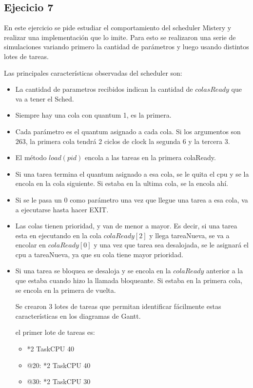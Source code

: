 \newpage
\subsection{Ejecicio 7}

En este ejercicio se pide estudiar el comportamiento del scheduler Mistery y realizar una implementación que lo imite.
Para esto se realizaron una serie de simulaciones variando primero la cantidad de parámetros y luego usando distintos lotes de tareas.

Las principales características observadas del scheduler son:
\begin{itemize}
\item La cantidad de parametros recibidos indican la cantidad de $colasReady$ que va a tener el Sched.
\item Siempre hay una cola con quantum 1, es la primera.
\item Cada parámetro es el quantum asignado a cada cola. Si los argumentos son $2 6 3$, la primera cola tendrá 2 ciclos de clock
la segunda 6 y la tercera 3.
\item El método $load(pid)$ encola a las tareas en la primera colaReady. 
\item Si una tarea termina el quantum asignado a esa cola, se le quita el cpu y se la encola en la cola siguiente. Si estaba en la ultima cola, se la encola ahí.
\item Si se le pasa un 0 como parámetro una vez que llegue una tarea a esa cola, va a ejecutarse hasta hacer EXIT.
\item Las colas tienen prioridad, y van de menor a mayor. Es decir, si una tarea esta en ejecutando en la cola $colaReady[2]$ y llega tareaNueva, se va a encolar
en $colaReady[0]$ y una vez que tarea sea desalojada, se le asignará el cpu a tareaNueva, ya que su cola tiene mayor prioridad.
\item Si una tarea se bloquea se desaloja y se encola en la $colaReady$ anterior a la que estaba cuando hizo la llamada bloqueante. Si estaba en la primera cola,
se encola en la primera de vuelta.

Se crearon 3 lotes de tareas que permitan identificar fácilmente estas características en los diagramas de Gantt.

el primer lote de tareas es:

\begin{itemize}

\item *2 TaskCPU 40
\item @20:
 *2 TaskCPU 40
\item @30:
*2 TaskCPU 30


\end{itemize}
\end{itemize}
